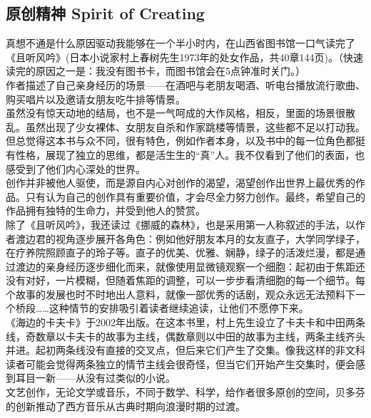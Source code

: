 \hypertarget{ux539fux521bux7cbeux795e-spirit-of-creating}{%
\subsection{原创精神 Spirit of
Creating}\label{ux539fux521bux7cbeux795e-spirit-of-creating}}

真想不通是什么原因驱动我能够在一个半小时内，在山西省图书馆一口气读完了《且听风吟》(日本小说家村上春树先生1973年的处女作品，共40章144页)。（快速读完的原因之一是：我没有图书卡，而图书馆会在5点钟准时关门。）\\
作者描述了自己亲身经历的场景------在酒吧与老朋友喝酒、听电台播放流行歌曲、购买唱片以及邀请女朋友吃牛排等情景。\\
虽然没有惊天动地的结局，也不是一气呵成的大作风格，相反，里面的场景很散乱。虽然出现了少女裸体、女朋友自杀和作家跳楼等情景，这些都不足以打动我。但总觉得这本书与众不同，很有特色，例如作者本身，以及书中的每一位角色都挺有性格，展现了独立的思维，都是活生生的``真''人。我不仅看到了他们的表面，也感受到了他们内心深处的世界。\\
创作并非被他人驱使，而是源自内心对创作的渴望，渴望创作出世界上最优秀的作品。只有认为自己的创作具有重要价值，才会尽全力努力创作。最终，希望自己的作品拥有独特的生命力，并受到他人的赞赏。\\
除了《且听风吟》，我还读过《挪威的森林》，也是采用第一人称叙述的手法，以作者渡边君的视角逐步展开各角色：例如他好朋友本月的女友直子，大学同学绿子，在疗养院照顾直子的玲子等。直子的优美、优雅、娴静，绿子的活泼烂漫，都是通过渡边的亲身经历逐步细化而来，就像使用显微镜观察一个细胞：起初由于焦距还没有对好，一片模糊，但随着焦距的调整，可以一步步看清细胞的每一个细节。每个故事的发展也时不时地出人意料，就像一部优秀的话剧，观众永远无法预料下一个桥段\ldots{}\ldots{}这种情节的安排吸引着读者继续追读，让他们不愿停下来。\\
《海边的卡夫卡》于2002年出版。在这本书里，村上先生设立了卡夫卡和中田两条线，奇数章以卡夫卡的故事为主线，偶数章则以中田的故事为主线，两条主线齐头并进。起初两条线没有直接的交叉点，但后来它们产生了交集。像我这样的非文科读者可能会觉得两条独立的情节主线会很奇怪，但当它们开始产生交集时，便会感到耳目一新------从没有过类似的小说。\\
文艺创作，无论文学或音乐，不同于数学、科学，给作者很多原创的空间，贝多芬的创新推动了西方音乐从古典时期向浪漫时期的过渡。

